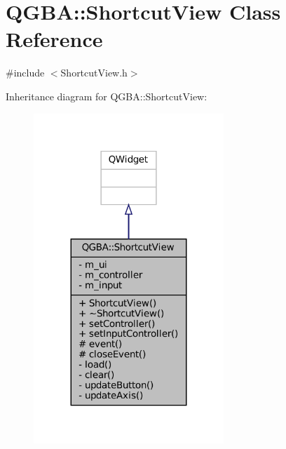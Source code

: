 \hypertarget{class_q_g_b_a_1_1_shortcut_view}{}\section{Q\+G\+BA\+:\+:Shortcut\+View Class Reference}
\label{class_q_g_b_a_1_1_shortcut_view}


{\ttfamily \#include $<$Shortcut\+View.\+h$>$}



Inheritance diagram for Q\+G\+BA\+:\+:Shortcut\+View\+:
\nopagebreak
\begin{figure}[H]
\begin{center}
\leavevmode
\includegraphics[width=203pt]{class_q_g_b_a_1_1_shortcut_view__inherit__graph}
\end{center}
\end{figure}


